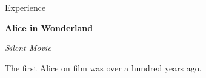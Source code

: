 \begin{rubric}{Experience}

    \textbf{Alice in Wonderland}\hfill
    \par
    \textit{Silent Movie}\par
    The first Alice on film was over a hundred years ago.
\end{rubric}
